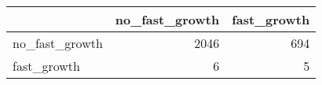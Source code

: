 
\begin{tabular}{lrr}
\toprule
  & no\_fast\_growth & fast\_growth\\
\midrule
no\_fast\_growth & 2046 & 694\\
fast\_growth & 6 & 5\\
\bottomrule
\end{tabular}